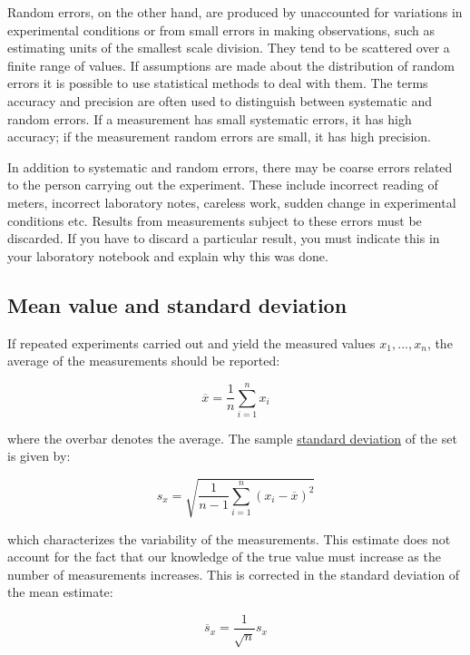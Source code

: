 \documentclass[byrevtex,amssymb,aps,pra,floatfix,letterpaper]{revtex4}
\begin{document}
Random errors, on the other hand, are produced by unaccounted for variations in experimental conditions or from small errors in making observations, such as estimating units of the smallest scale division. They tend to be scattered over a finite range of values. If assumptions are made about the distribution of random errors it is possible to use statistical methods to deal with them. The terms accuracy and precision are often used to distinguish between systematic and random errors. If a measurement has small systematic errors, it has high accuracy; if the measurement random errors are small, it has high precision.

In addition to systematic and random errors, there may be coarse errors related to the person carrying out the experiment. These include incorrect reading of meters, incorrect laboratory notes, careless work, sudden change in experimental conditions etc. Results from measurements subject to these errors must be discarded. If you have to discard a particular result, you must indicate this in your laboratory notebook and explain why this was done.

\subsection{Mean value and standard deviation}

If repeated experiments carried out and yield the measured values $x_1, ..., x_n$, the average of the measurements should be reported:

\begin{equation}
\label{eq11}
\overline{x} = \frac{1}{n}\sum\limits_{i=1}^{n} x_i
\end{equation}

\noindent
where the overbar denotes the average. The sample \href{http://en.wikipedia.org/wiki/Standard_deviation}{\underline{standard deviation}} of the set is given by:

\begin{equation}
\label{eq12}
s_x = \sqrt{\frac{1}{n-1}\sum\limits_{i=1}^{n}\left(x_i - \overline{x}\right)^2}
\end{equation}

\noindent
which characterizes the variability of the measurements. This estimate does not account for the
fact that our knowledge of the true value must increase as the number of measurements increases.
This is corrected in the standard deviation of the mean estimate:

\begin{equation}
\label{eq13}
\overline{s}_x = \frac{1}{\sqrt{n}}s_x
\end{equation}
\end{document}
